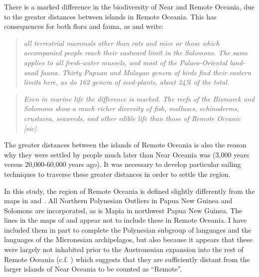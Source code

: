 \documentclass[unnumsec,webpdf,modern,medium]{oup-authoring-template}
\begin{document}
There is a marked difference in the biodiversity of Near and Remote Oceania, due to the greater distances between islands in Remote Oceania. This has consequences for both flora and fauna, as \citet{green1991near} and \citet{pawley2007locatingoceanic} write:

\begin{quotation}
\noindent \emph{all terrestrial mammals other than rats and mice or those which accompanied people reach their eastward limit in the Solomons. The same applies to all fresh-water mussels, and most of the Palaeo-Oriental land-snail fauna. Thirty Papuan and Malayan genera of birds find their eastern limits here, as do 162 genera of seed-plants, about 24\% of the total.}
\end{quotation}
\begin{flushright} \citet[495]{green1991near}
\end{flushright}

\begin{quotation}
\noindent \emph{Even in marine life the difference is marked. The reefs of the Bismarck and Solomons show a much richer diversity of fish, molluscs, echinoderms, crustacea, seaweeds, and other edible life than those of Remote Oceanic [sic].}
\end{quotation}
\begin{flushright}  \citet[19]{pawley2007locatingoceanic} \end{flushright}

The greater distances between the islands of Remote Oceania is also the reason why they were settled by people much later than Near Oceania was (3,000 years versus 20,000-60,000 years ago). It was necessary to develop particular sailing techniques to traverse these greater distances in order to settle the region.

In this study, the region of Remote Oceania is defined slightly differently from the maps in \citet{green1991near} and \citet{pawley2007locatingoceanic}. All Northern Polynesian Outliers in Papua New Guinea and Solomons are incorporated, as is Mapia in northwest Papua New Guinea. The lines in the maps of \citet{green1991near} and \citet{pawley2007locatingoceanic} appear not to include these in Remote Oceania. I have included them in part to complete the Polynesian subgroup of languages and the languages of the Micronesian archipelagos, but also because it appears that these were largely not inhabited prior to the Austronesian expansion into the rest of Remote Oceania (c.f. \citet[23]{kirch2012basline}) which suggests that they are sufficiently distant from the larger islands of Near Oceania to be counted as ``Remote''.
\end{document}
